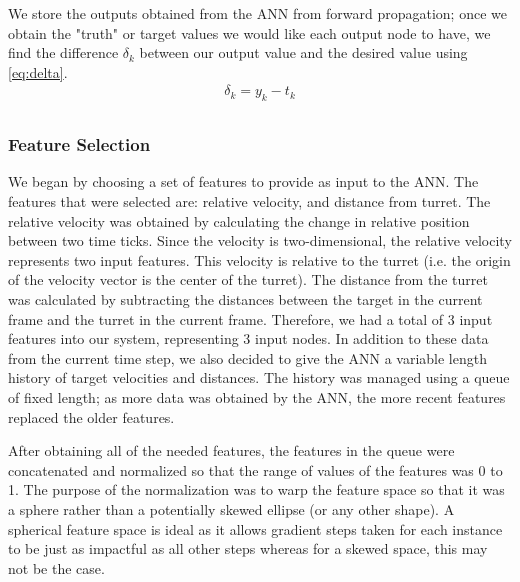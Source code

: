 \documentclass[11pt,letterpaper]{article}
\begin{document}
We store the outputs obtained from the ANN from forward propagation; once we obtain the "truth" or target values we would like each output node to have, we find the difference $\delta_k$ between our output value and the desired value using \eqref{eq:delta}. 
\begin{align} \label{eq:delta}
\delta_k = y_k - t_k\\
\end{align}


\subsubsection{Feature Selection}
We began by choosing a set of features to provide as input to the ANN. The features that were selected are: relative velocity, and distance from turret. The relative velocity was obtained by calculating the change in relative position between two time ticks. Since the velocity is two-dimensional, the relative velocity represents two input features. This velocity is relative to the turret (i.e. the origin of the velocity vector is the center of the turret). The distance from the turret was calculated by subtracting the distances between the target in the current frame and the turret in the current frame. Therefore, we had a total of 3 input features into our system, representing 3 input nodes. In addition to these data from the current time step, we also decided to give the ANN a variable length history of target velocities and distances. The history was managed using a queue of fixed length; as more data was obtained by the ANN, the more recent features replaced the older features.

After obtaining all of the needed features, the features in the queue were concatenated and normalized so that the range of values of the features was 0 to 1. The purpose of the normalization was to warp the feature space so that it was a sphere rather than a potentially skewed ellipse (or any other shape). A spherical feature space is ideal as it allows gradient steps taken for each instance to be just as impactful as all other steps whereas for a skewed space, this may not be the case.
\end{document}
